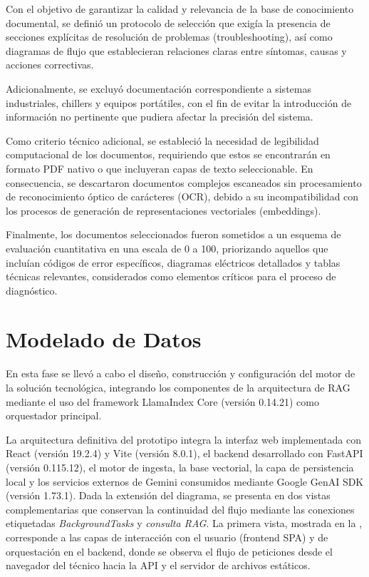 {{Con el objetivo de garantizar la calidad y relevancia de la base de conocimiento documental, se definió un protocolo de selección que exigía la presencia de secciones explícitas de resolución de problemas (troubleshooting), así como diagramas de flujo que establecieran relaciones claras entre síntomas, causas y acciones correctivas.

Adicionalmente, se excluyó documentación correspondiente a sistemas industriales, chillers y equipos portátiles, con el fin de evitar la introducción de información no pertinente que pudiera afectar la precisión del sistema.

Como criterio técnico adicional, se estableció la necesidad de legibilidad computacional de los documentos, requiriendo que estos se encontrarán en formato PDF nativo o que incluyeran capas de texto seleccionable. En consecuencia, se descartaron documentos complejos escaneados sin procesamiento de reconocimiento óptico de carácteres (OCR), debido a su incompatibilidad con los procesos de generación de representaciones vectoriales (embeddings).

Finalmente, los documentos seleccionados fueron sometidos a un esquema de evaluación cuantitativa en una escala de 0 a 100, priorizando aquellos que incluían códigos de error específicos, diagramas eléctricos detallados y tablas técnicas relevantes, considerados como elementos críticos para el proceso de diagnóstico.

\section{Modelado de Datos}

En esta fase se llevó a cabo el diseño, construcción y configuración del motor de la solución tecnológica, integrando los componentes de la arquitectura de RAG mediante el uso del framework LlamaIndex Core (versión 0.14.21) como orquestador principal.

La arquitectura definitiva del prototipo integra la interfaz web implementada con React (versión 19.2.4) y Vite (versión 8.0.1), el backend desarrollado con FastAPI (versión 0.115.12), el motor de ingesta, la base vectorial, la capa de persistencia local y los servicios externos de Gemini consumidos mediante Google GenAI SDK (versión 1.73.1). Dada la extensión del diagrama, se presenta en dos vistas complementarias que conservan la continuidad del flujo mediante las conexiones etiquetadas \textit{BackgroundTasks} y \textit{consulta RAG}. La primera vista, mostrada en la , corresponde a las capas de interacción con el usuario (frontend SPA) y de orquestación en el backend, donde se observa el flujo de peticiones desde el navegador del técnico hacia la API y el servidor de archivos estáticos.

}}
